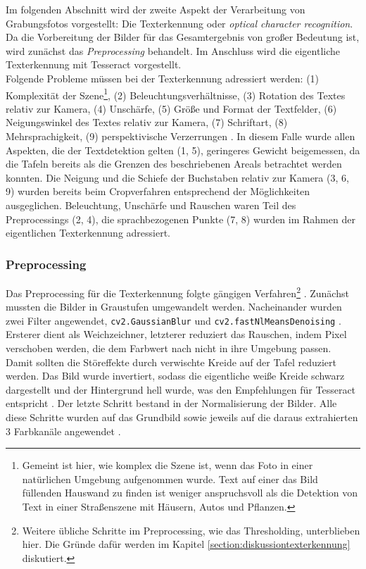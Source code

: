 Im folgenden Abschnitt wird der zweite Aspekt der Verarbeitung von Grabungsfotos vorgestellt: Die Texterkennung oder \textit{optical character recognition}. Da die Vorbereitung der Bilder für das Gesamtergebnis von großer Bedeutung ist, wird zunächst das \textit{Preprocessing} behandelt. Im Anschluss wird die eigentliche Texterkennung mit Tesseract vorgestellt.\\
Folgende Probleme müssen bei der Texterkennung adressiert werden: (1) Komplexität der Szene\footnote{Gemeint ist hier, wie komplex die Szene ist, wenn das Foto in einer natürlichen Umgebung aufgenommen wurde. Text auf einer das Bild füllenden Hauswand zu finden ist weniger anspruchsvoll als die Detektion von Text in einer Straßenszene mit Häusern, Autos und Pflanzen.}, (2) Beleuchtungsverhältnisse, (3) Rotation des Textes relativ zur Kamera, (4) Unschärfe, (5) Größe und Format der Textfelder, (6) Neigungswinkel des Textes relativ zur Kamera, (7) Schriftart, (8) Mehrsprachigkeit, (9) perspektivische Verzerrungen \cite{hamad}. In diesem Falle wurde allen Aspekten, die der Textdetektion gelten (1, 5), geringeres Gewicht beigemessen, da die Tafeln bereits als die Grenzen des beschriebenen Areals betrachtet werden konnten. Die Neigung und die Schiefe der Buchstaben relativ zur Kamera (3, 6, 9) wurden bereits beim Cropverfahren entsprechend der Möglichkeiten ausgeglichen. Beleuchtung, Unschärfe und Rauschen waren Teil des Preprocessings (2, 4), die sprachbezogenen Punkte (7, 8) wurden im Rahmen der eigentlichen Texterkennung adressiert.

\subsubsection{Preprocessing}

Das Preprocessing für die Texterkennung folgte gängigen Verfahren\footnote{Weitere übliche Schritte im Preprocessing, wie das Thresholding, unterblieben hier. Die Gründe dafür werden im Kapitel \ref{section:diskussiontexterkennung} diskutiert.} \cite{jenilshah}{}  \cite{sumedhahallale}. Zunächst mussten die Bilder in Graustufen umgewandelt werden. Nacheinander wurden zwei Filter angewendet, \verb|cv2.GaussianBlur| \cite{opencvfilter}{} und \verb|cv2.fastNlMeansDenoising| \cite{opencvdenoise}. Ersterer dient als Weichzeichner, letzterer reduziert das Rauschen, indem Pixel verschoben werden, die dem Farbwert nach nicht in ihre Umgebung passen. Damit sollten die Störeffekte durch verwischte Kreide auf der Tafel reduziert werden. Das Bild wurde invertiert, sodass die eigentliche weiße Kreide schwarz dargestellt und der Hintergrund hell wurde, was den Empfehlungen für Tesseract entspricht \cite{tesseractoptimum}. Der letzte Schritt bestand in der Normalisierung der Bilder. Alle diese Schritte wurden auf das Grundbild sowie jeweils auf die daraus extrahierten 3 Farbkanäle angewendet \cite{xilinchen}.

